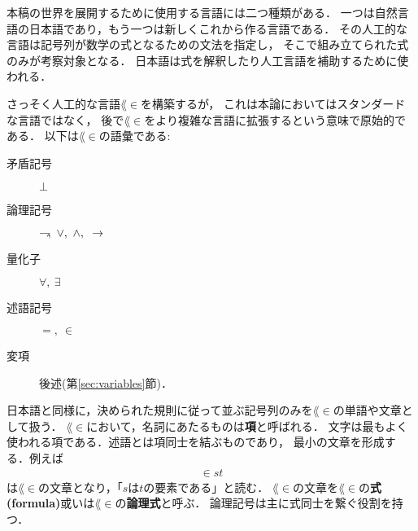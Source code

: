 	本稿の世界を展開するために使用する言語には二つ種類がある．
	一つは自然言語の日本語であり，もう一つは新しくこれから作る言語である．
	その人工的な言語は記号列が数学の式となるための文法を指定し，
	そこで組み立てられた式のみが考察対象となる．
	日本語は式を解釈したり人工言語を補助するために使われる．
	
	さっそく人工的な言語$\lang{\in}$を構築するが，
	これは本論においてはスタンダードな言語ではなく，
	後で$\lang{\in}$をより複雑な言語に拡張するという意味で原始的である．
	以下は$\lang{\in}$の語彙である:
	\begin{description}
		\item[矛盾記号] $\bot$
		\item[論理記号] $\negation,\ \vee,\ \wedge,\ \rarrow$
		\item[量化子] $\forall,\ \exists$
		\item[述語記号] $=,\ \in$
		\item[変項] 後述(第\ref{sec:variables}節)．
			
			
	\end{description}
	
	日本語と同様に，決められた規則に従って並ぶ記号列のみを$\lang{\in}$の単語や文章として扱う．
	$\lang{\in}$において，名詞にあたるものは{\bf 項}と呼ばれる．
	文字は最もよく使われる項である．述語とは項同士を結ぶものであり，
	最小の文章を形成する．例えば
	\begin{align}
		\in st
	\end{align}
	は$\lang{\in}$の文章となり，「$s$は$t$の要素である」と読む．
	$\lang{\in}$の文章を$\lang{\in}$の{\bf 式}
	{\bf (formula)}或いは$\lang{\in}$の{\bf 論理式}と呼ぶ．
	論理記号は主に式同士を繋ぐ役割を持つ．
	
